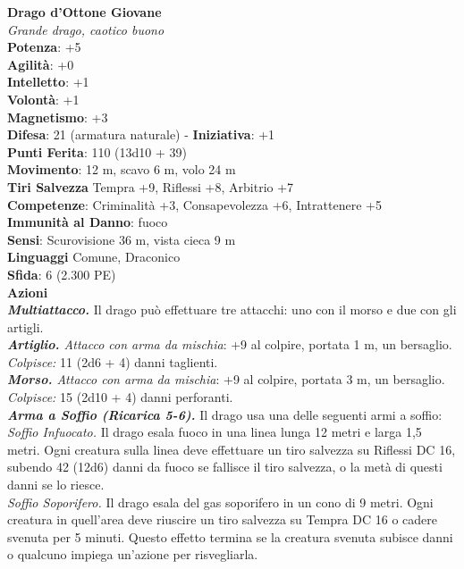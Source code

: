 \begin{multicols}{2}
\medskip\textbf{Drago d'Ottone Giovane}\\
\emph{Grande drago, caotico buono}\\
\textbf{Potenza}: +5\\
\textbf{Agilità}: +0\\
\textbf{Intelletto}: +1\\
\textbf{Volontà}: +1\\
\textbf{Magnetismo}: +3\\
\textbf{Difesa}: 21 (armatura naturale) - \textbf{Iniziativa}: +1\\
\textbf{Punti Ferita}: 110 (13d10 + 39)\\
\textbf{Movimento}: 12 m, scavo 6 m, volo 24 m\\
\textbf{Tiri Salvezza} Tempra +9, Riflessi +8, Arbitrio +7\\
\textbf{Competenze}: Criminalità +3, Consapevolezza +6, Intrattenere +5\\
\textbf{Immunità al Danno}: fuoco\\
\textbf{Sensi}: Scurovisione 36 m, vista cieca 9 m\\
\textbf{Linguaggi} Comune, Draconico\\
\textbf{Sfida}: 6 (2.300 PE)\smallskip\\
\smallskip\textbf{Azioni}\\
\emph{\textbf{Multiattacco.}} Il drago può effettuare tre attacchi: uno con il morso e due con gli artigli.\\
\emph{\textbf{Artiglio.} Attacco con arma da mischia}: +9 al colpire, portata 1 m, un bersaglio.\\
\emph{Colpisce:} 11 (2d6 + 4) danni taglienti.\\
\emph{\textbf{Morso.} Attacco con arma da mischia}: +9 al colpire, portata 3 m, un bersaglio.\\
\emph{Colpisce:} 15 (2d10 + 4) danni perforanti.\\
\emph{\textbf{Arma a Soffio (Ricarica 5-6).}} Il drago usa una delle seguenti armi a soffio:\\
\emph{Soffio Infuocato.} Il drago esala fuoco in una linea lunga 12 metri e larga 1,5 metri. Ogni creatura sulla linea deve effettuare un tiro salvezza su Riflessi DC  16, subendo 42 (12d6) danni da fuoco se fallisce il tiro salvezza, o la metà di questi danni se lo riesce.\\
\emph{Soffio Soporifero.} Il drago esala del gas soporifero in un cono di 9 metri. Ogni creatura in quell'area deve riuscire un tiro salvezza su Tempra DC  16 o cadere svenuta per 5 minuti. Questo effetto termina se la creatura svenuta subisce danni o qualcuno impiega un'azione per risvegliarla.\\

\end{multicols}
